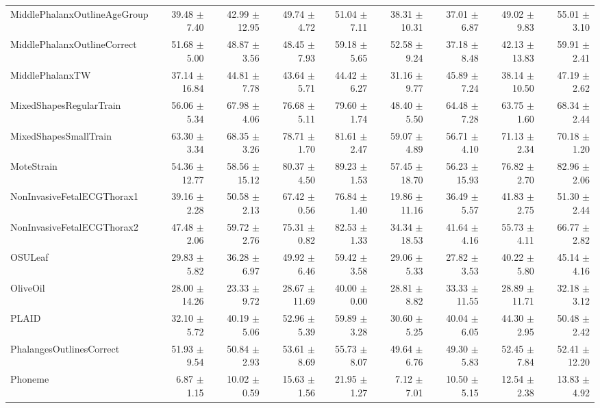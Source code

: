 \begin{landscape}
\begin{longtable}{lrrrrrrrr}
MiddlePhalanxOutlineAgeGroup & 39.48 $\pm$ 7.40 & 42.99 $\pm$ 12.95 & 49.74 $\pm$ 4.72 & 51.04 $\pm$ 7.11 & 38.31 $\pm$ 10.31 & 37.01 $\pm$ 6.87 & 49.02 $\pm$ 9.83 & 55.01 $\pm$ 3.10 \\
MiddlePhalanxOutlineCorrect & 51.68 $\pm$ 5.00 & 48.87 $\pm$ 3.56 & 48.45 $\pm$ 7.93 & 59.18 $\pm$ 5.65 & 52.58 $\pm$ 9.24 & 37.18 $\pm$ 8.48 & 42.13 $\pm$ 13.83 & 59.91 $\pm$ 2.41 \\
MiddlePhalanxTW & 37.14 $\pm$ 16.84 & 44.81 $\pm$ 7.78 & 43.64 $\pm$ 5.71 & 44.42 $\pm$ 6.27 & 31.16 $\pm$ 9.77 & 45.89 $\pm$ 7.24 & 38.14 $\pm$ 10.50 & 47.19 $\pm$ 2.62 \\
MixedShapesRegularTrain & 56.06 $\pm$ 5.34 & 67.98 $\pm$ 4.06 & 76.68 $\pm$ 5.11 & 79.60 $\pm$ 1.74 & 48.40 $\pm$ 5.50 & 64.48 $\pm$ 7.28 & 63.75 $\pm$ 1.60 & 68.34 $\pm$ 2.44 \\
MixedShapesSmallTrain & 63.30 $\pm$ 3.34 & 68.35 $\pm$ 3.26 & 78.71 $\pm$ 1.70 & 81.61 $\pm$ 2.47 & 59.07 $\pm$ 4.89 & 56.71 $\pm$ 4.10 & 71.13 $\pm$ 2.34 & 70.18 $\pm$ 1.20 \\
MoteStrain & 54.36 $\pm$ 12.77 & 58.56 $\pm$ 15.12 & 80.37 $\pm$ 4.50 & 89.23 $\pm$ 1.53 & 57.45 $\pm$ 18.70 & 56.23 $\pm$ 15.93 & 76.82 $\pm$ 2.70 & 82.96 $\pm$ 2.06 \\
NonInvasiveFetalECGThorax1 & 39.16 $\pm$ 2.28 & 50.58 $\pm$ 2.13 & 67.42 $\pm$ 0.56 & 76.84 $\pm$ 1.40 & 19.86 $\pm$ 11.16 & 36.49 $\pm$ 5.57 & 41.83 $\pm$ 2.75 & 51.30 $\pm$ 2.44 \\
NonInvasiveFetalECGThorax2 & 47.48 $\pm$ 2.06 & 59.72 $\pm$ 2.76 & 75.31 $\pm$ 0.82 & 82.53 $\pm$ 1.33 & 34.34 $\pm$ 18.53 & 41.64 $\pm$ 4.16 & 55.73 $\pm$ 4.11 & 66.77 $\pm$ 2.82 \\
OSULeaf & 29.83 $\pm$ 5.82 & 36.28 $\pm$ 6.97 & 49.92 $\pm$ 6.46 & 59.42 $\pm$ 3.58 & 29.06 $\pm$ 5.33 & 27.82 $\pm$ 3.53 & 40.22 $\pm$ 5.80 & 45.14 $\pm$ 4.16 \\
OliveOil & 28.00 $\pm$ 14.26 & 23.33 $\pm$ 9.72 & 28.67 $\pm$ 11.69 & 40.00 $\pm$ 0.00 & 28.81 $\pm$ 8.82 & 33.33 $\pm$ 11.55 & 28.89 $\pm$ 11.71 & 32.18 $\pm$ 3.12 \\
PLAID & 32.10 $\pm$ 5.72 & 40.19 $\pm$ 5.06 & 52.96 $\pm$ 5.39 & 59.89 $\pm$ 3.28 & 30.60 $\pm$ 5.25 & 40.04 $\pm$ 6.05 & 44.30 $\pm$ 2.95 & 50.48 $\pm$ 2.42 \\
PhalangesOutlinesCorrect & 51.93 $\pm$ 9.54 & 50.84 $\pm$ 2.93 & 53.61 $\pm$ 8.69 & 55.73 $\pm$ 8.07 & 49.64 $\pm$ 6.76 & 49.30 $\pm$ 5.83 & 52.45 $\pm$ 7.84 & 52.41 $\pm$ 12.20 \\
Phoneme & 6.87 $\pm$ 1.15 & 10.02 $\pm$ 0.59 & 15.63 $\pm$ 1.56 & 21.95 $\pm$ 1.27 & 7.12 $\pm$ 7.01 & 10.50 $\pm$ 5.15 & 12.54 $\pm$ 2.38 & 13.83 $\pm$ 4.92 \\

\end{longtable}
\end{landscape}
